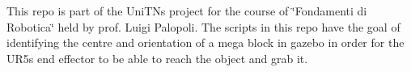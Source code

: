 This repo is part of the Uni\+TN\textquotesingle{}s project for the course of \char`\"{}\+Fondamenti di Robotica\char`\"{} held by prof. Luigi Palopoli. The scripts in this repo have the goal of identifying the centre and orientation of a mega block in gazebo in order for the U\+R5\textquotesingle{}s end effector to be able to reach the object and grab it. 